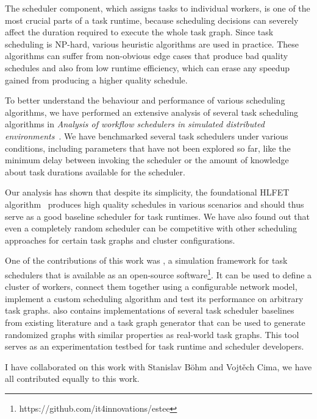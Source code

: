 The scheduler component, which assigns tasks to individual workers, is one of the
most crucial parts of a task runtime, because scheduling decisions can severely affect the
duration required to execute the whole task graph. Since task scheduling is NP-hard, various
heuristic algorithms are used in practice. These algorithms can suffer from non-obvious edge cases
that produce bad quality schedules and also from low runtime efficiency, which can erase any
speedup gained from producing a higher quality schedule.

To better understand the behaviour and performance of various scheduling algorithms, we have
performed an extensive analysis of several task scheduling algorithms in
\emph{Analysis of workflow schedulers in simulated distributed environments}~\cite{estee}.
We have benchmarked several task schedulers under various conditions, including parameters that
have not been explored so far, like the minimum delay between invoking the
scheduler or the amount of knowledge about task durations available for the scheduler.

Our analysis has shown that despite its simplicity, the foundational HLFET
algorithm~\cite{hlfet1974} produces high quality schedules in various scenarios and should thus
serve as a good baseline scheduler for task runtimes. We have also found out that even a
completely random scheduler can be competitive with other scheduling approaches for certain task
graphs and cluster configurations.


One of the contributions of this work was \estee{}, a simulation framework for task
schedulers that is available as an open-source software\footnote{https://github.com/it4innovations/estee}.
It can be used to define a cluster of workers, connect them together using a configurable network
model, implement a custom scheduling algorithm and test its performance on arbitrary task graphs.
\estee{} also contains implementations of several task scheduler baselines from existing literature
and a task graph generator that can be used to generate randomized graphs with similar properties as
real-world task graphs. This tool serves as an experimentation testbed for task runtime and scheduler
developers.

I have collaborated on this work with Stanislav Böhm and Vojtěch Cima, we have all contributed
equally to this work.
